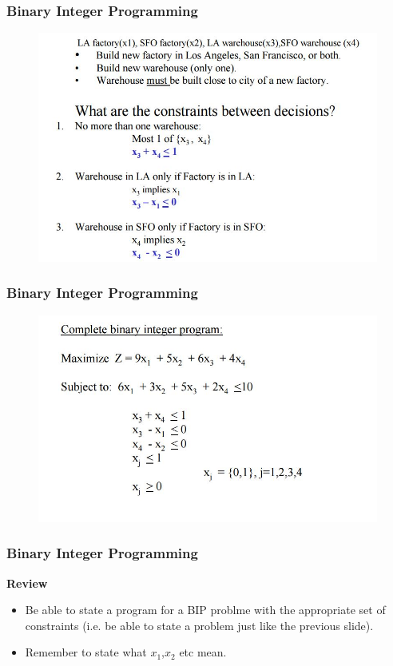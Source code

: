 \documentclass{beamer}
\begin{document}
\begin{frame}
	\frametitle{Binary Integer Programming}
	\large
	\begin{figure}
		\centering
		\includegraphics[width=1.1\linewidth]{calaircraft7}
	\end{figure}
\end{frame}
\begin{frame}
	\frametitle{Binary Integer Programming}
	\large
	\begin{figure}
		\centering
		\includegraphics[width=1.1\linewidth]{calaircraft8}
	\end{figure}
\end{frame}
\begin{frame}
\frametitle{Binary Integer Programming}
\Large
\noindent\textbf{Review}
\begin{itemize}
	\item Be able to state a program for a BIP problme with the appropriate set of constraints (i.e. be able to state a problem just like the previous slide).
	\item Remember to state what $x_1$,$x_2$ etc mean.
\end{itemize}
\end{frame}
\end{document}
